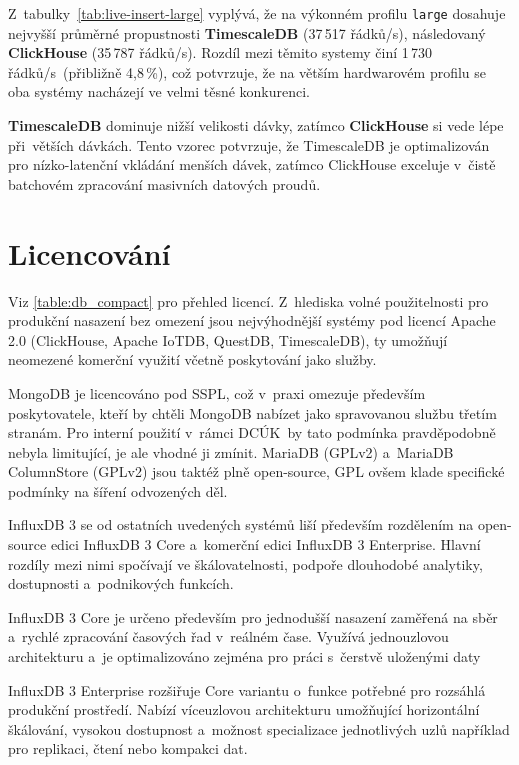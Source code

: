 Z~tabulky~\ref{tab:live-insert-large} vyplývá, že na výkonném profilu \texttt{large} dosahuje nejvyšší průměrné propustnosti \textbf{TimescaleDB} (37\,517 řádků/s), následovaný \textbf{ClickHouse} (35\,787 řádků/s). 
Rozdíl mezi těmito systemy činí 1\,730 řádků/s~(přibližně 4,8\,\%), což potvrzuje, že na větším hardwarovém profilu se oba systémy nacházejí ve velmi těsné konkurenci.

\textbf{TimescaleDB} dominuje nižší velikosti dávky, zatímco \textbf{ClickHouse} si vede lépe při~větších dávkách. Tento vzorec potvrzuje, že TimescaleDB je optimalizován pro nízko-latenční vkládání menších dávek, zatímco ClickHouse exceluje v~čistě batchovém zpracování masivních datových proudů.

\section{Licencování}
Viz \ref{table:db_compact} pro přehled licencí. 
Z~hlediska volné použitelnosti pro produkční nasazení bez omezení jsou nejvýhodnější systémy pod licencí Apache 2.0 (ClickHouse, Apache IoTDB, QuestDB, \mbox{TimescaleDB}), ty umožňují neomezené komerční využití včetně poskytování jako služby.

MongoDB je licencováno pod SSPL, což v~praxi omezuje především poskytovatele, kteří by chtěli MongoDB nabízet jako spravovanou službu třetím stranám. Pro interní použití v~rámci DCÚK~by tato podmínka pravděpodobně nebyla limitující, je ale vhodné ji zmínit. MariaDB (GPLv2) a~MariaDB ColumnStore (GPLv2) jsou taktéž plně open-source, GPL ovšem klade specifické podmínky na šíření odvozených děl.

InfluxDB 3 se od ostatních uvedených systémů liší především rozdělením na open-source edici InfluxDB 3 Core a~komerční edici InfluxDB 3 Enterprise. Hlavní rozdíly mezi nimi spočívají ve škálovatelnosti, podpoře dlouhodobé analytiky, dostupnosti a~podnikových funkcích.

InfluxDB 3 Core je určeno především pro jednodušší nasazení zaměřená na sběr a~rychlé zpracování časových řad v~reálném čase. Využívá jednouzlovou architekturu a~je optimalizováno zejména pro práci s~čerstvě uloženými daty

InfluxDB 3 Enterprise rozšiřuje Core variantu o~funkce potřebné pro rozsáhlá produkční prostředí. Nabízí víceuzlovou architekturu umožňující horizontální škálování, vysokou dostupnost a~možnost specializace jednotlivých uzlů například pro replikaci, čtení nebo kompakci dat.

